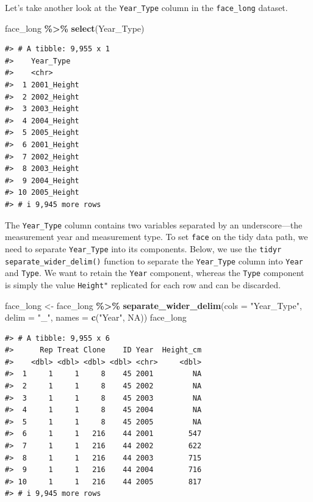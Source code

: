 \documentclass[
  11pt,
]{krantz}
\newenvironment{Shaded}{\begin{snugshade}}{\end{snugshade}}
\newcommand{\DataTypeTok}[1]{\textcolor[rgb]{0.13,0.29,0.53}{#1}}
\newcommand{\KeywordTok}[1]{\textcolor[rgb]{0.13,0.29,0.53}{\textbf{#1}}}
\newcommand{\NormalTok}[1]{#1}
\newcommand{\OperatorTok}[1]{\textcolor[rgb]{0.81,0.36,0.00}{\textbf{#1}}}
\newcommand{\OtherTok}[1]{\textcolor[rgb]{0.56,0.35,0.01}{#1}}
\newcommand{\StringTok}[1]{\textcolor[rgb]{0.31,0.60,0.02}{#1}}
\theoremstyle{definition}
\theoremstyle{definition}
\theoremstyle{definition}
\theoremstyle{definition}
\theoremstyle{remark}
\begin{document}
Let's take another look at the \texttt{Year\_Type} column in the \texttt{face\_long} dataset.

\begin{Shaded}
\begin{Highlighting}[]
\NormalTok{face\_long }\OperatorTok{\%\textgreater{}\%}\StringTok{ }\KeywordTok{select}\NormalTok{(Year\_Type)}
\end{Highlighting}
\end{Shaded}

\begin{verbatim}
#> # A tibble: 9,955 x 1
#>    Year_Type  
#>    <chr>      
#>  1 2001_Height
#>  2 2002_Height
#>  3 2003_Height
#>  4 2004_Height
#>  5 2005_Height
#>  6 2001_Height
#>  7 2002_Height
#>  8 2003_Height
#>  9 2004_Height
#> 10 2005_Height
#> # i 9,945 more rows
\end{verbatim}

The \texttt{Year\_Type} column contains two variables separated by an underscore---the measurement year and measurement type. To set \texttt{face} on the tidy data path, we need to separate \texttt{Year\_Type} into its components. Below, we use the \texttt{tidyr} \texttt{separate\_wider\_delim()} function to separate the \texttt{Year\_Type} column into \texttt{Year} and \texttt{Type}. We want to retain the \texttt{Year} component, whereas the \texttt{Type} component is simply the value \texttt{\textquotesingle{}Height"} replicated for each row and can be discarded.

\begin{Shaded}
\begin{Highlighting}[]
\NormalTok{face\_long \textless{}{-}}\StringTok{ }\NormalTok{face\_long }\OperatorTok{\%\textgreater{}\%}
\StringTok{  }\KeywordTok{separate\_wider\_delim}\NormalTok{(}\DataTypeTok{cols =} \StringTok{"Year\_Type"}\NormalTok{,}
                       \DataTypeTok{delim =} \StringTok{"\_"}\NormalTok{,}
                       \DataTypeTok{names =} \KeywordTok{c}\NormalTok{(}\StringTok{"Year"}\NormalTok{, }\OtherTok{NA}\NormalTok{))}
\NormalTok{face\_long}
\end{Highlighting}
\end{Shaded}

\begin{verbatim}
#> # A tibble: 9,955 x 6
#>      Rep Treat Clone    ID Year  Height_cm
#>    <dbl> <dbl> <dbl> <dbl> <chr>     <dbl>
#>  1     1     1     8    45 2001         NA
#>  2     1     1     8    45 2002         NA
#>  3     1     1     8    45 2003         NA
#>  4     1     1     8    45 2004         NA
#>  5     1     1     8    45 2005         NA
#>  6     1     1   216    44 2001        547
#>  7     1     1   216    44 2002        622
#>  8     1     1   216    44 2003        715
#>  9     1     1   216    44 2004        716
#> 10     1     1   216    44 2005        817
#> # i 9,945 more rows
\end{verbatim}
\end{document}
